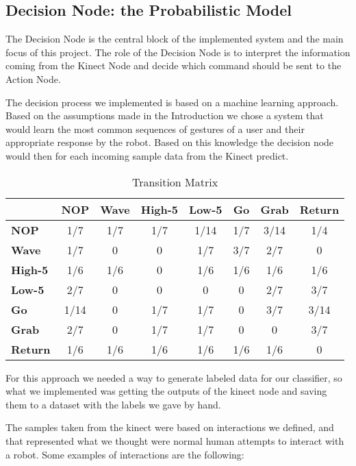 \subsection{Decision Node: the Probabilistic Model}
The Decision Node is the central block of the implemented system and the main focus of this project. The role of the Decision Node is to interpret the information coming from the Kinect Node and decide which command should be sent to the Action Node.

The decision process we implemented is based on a machine learning approach. Based on the assumptions made in the Introduction we chose a system that would learn the most common sequences of gestures of a user and their appropriate response by the robot. Based on this knowledge the decision node would then for each incoming sample data from the Kinect predict.


\begin{table*}[t]
\centering
\caption{Transition Matrix}
\label{transition_matrix}
\begin{tabular}{|l|ccccccc|}
\hline
 & \multicolumn{1}{c|}{\textbf{NOP}} & \multicolumn{1}{c|}{\textbf{Wave}} & \multicolumn{1}{c|}{\textbf{High-5}} & \multicolumn{1}{c|}{\textbf{Low-5}} & \multicolumn{1}{c|}{\textbf{Go}} & \multicolumn{1}{c|}{\textbf{Grab}} & \textbf{Return} \\ \hline
\textbf{NOP} & 1/7 & 1/7 & 1/7 & 1/14 & 1/7 & 3/14 & 1/4 \\ \cline{1-1}
\textbf{Wave} & 1/7 & 0 & 0 & 1/7 & 3/7 & 2/7 & 0 \\ \cline{1-1}
\textbf{High-5} & 1/6 & 1/6 & 0 & 1/6 & 1/6 & 1/6 & 1/6 \\ \cline{1-1}
\textbf{Low-5} & 2/7 & 0 & 0 & 0 & 0 & 2/7 & 3/7 \\ \cline{1-1}
\textbf{Go} & 1/14 & 0 & 1/7 & 1/7 & 0 & 3/7 & 3/14 \\ \cline{1-1}
\textbf{Grab} & 2/7 & 0 & 1/7 & 1/7 & 0 & 0 & 3/7 \\ \cline{1-1}
\textbf{Return} & 1/6 & 1/6 & 1/6 & 1/6 & 1/6 & 1/6 & 0 \\ \hline
\end{tabular}
\end{table*}

For this approach we needed a way to generate labeled data for our classifier, so what we implemented was getting the outputs of the kinect node and saving them to a dataset with the labels we gave by hand.

The samples taken from the kinect were based on interactions we defined, and that represented what we thought were normal human attempts to interact with a robot. Some examples of interactions are the following:

